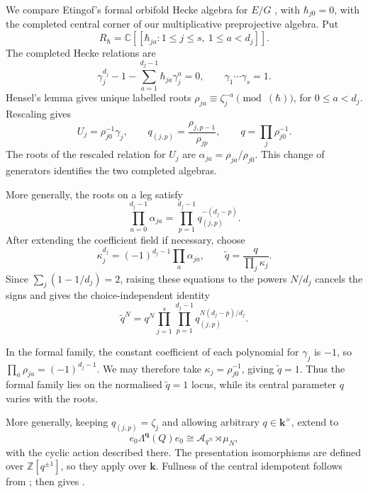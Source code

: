 \documentclass[a4paper]{amsart}
\newcommand{\kk}{\mathbf{k}}
\newcommand{\ZZ}{\mathbb{Z}}
\newcommand{\C}{\mathbb{C}}
\numberwithin{equation}{section}
\begin{document}
We compare Etingof's formal orbifold Hecke algebra for $E/G$
\cite{EtingofOrbifold}, with $\hbar_{j0}=0$, with the completed
central corner of our multiplicative preprojective algebra. Put
\[
 R_\hbar=\C[[\hbar_{ja}:1\le j\le s,\ 1\le a<d_j]].
\]
The completed Hecke relations are
\[
 \gamma_j^{d_j}-1-\sum_{a=1}^{d_j-1}\hbar_{ja}\gamma_j^a=0,
 \qquad \gamma_1\cdots\gamma_s=1.
\]
Hensel's lemma gives unique labelled roots
$\rho_{ja}\equiv\zeta_j^{-a}\pmod{(\hbar)}$, for
$0\le a<d_j$. Rescaling gives
\begin{equation}\label{eq:formal-parameter-dictionary}
 U_j=\rho_{j0}^{-1}\gamma_j,\qquad
 q_{(j,p)}=\frac{\rho_{j,p-1}}{\rho_{jp}},\qquad
 q=\prod_j\rho_{j0}^{-1}.
\end{equation}
The roots of the rescaled relation for $U_j$ are
$\alpha_{ja}=\rho_{ja}/\rho_{j0}$. This change of generators
identifies the two completed algebras.

More generally, the roots on a leg satisfy
\[
 \prod_{a=0}^{d_j-1}\alpha_{ja}
 =\prod_{p=1}^{d_j-1}q_{(j,p)}^{-(d_j-p)}.
\]
After extending the coefficient field if necessary, choose
\[
 \kappa_j^{d_j}=(-1)^{d_j-1}\prod_a\alpha_{ja},\qquad
 \widetilde q=\frac{q}{\prod_j\kappa_j}.
\]
Since $\sum_j(1-1/d_j)=2$, raising these equations to the powers
$N/d_j$ cancels the signs and gives the choice-independent identity
\begin{equation}\label{eq:normalised-parameter}
 \widetilde q^N
   =q^N\prod_{j=1}^s\prod_{p=1}^{d_j-1}
          q_{(j,p)}^{N(d_j-p)/d_j}.
\end{equation}

In the formal family, the constant coefficient of each polynomial
for $\gamma_j$ is $-1$, so $\prod_a\rho_{ja}=(-1)^{d_j-1}$.
We may therefore take $\kappa_j=\rho_{j0}^{-1}$, giving
$\widetilde q=1$. Thus the formal family lies on the normalised
$\widetilde q=1$ locus, while its central parameter $q$ varies
with the roots.

More generally, keeping $q_{(j,p)}=\zeta_j$ and allowing arbitrary
$q\in\kk^\times$, \cite[Sections~2 and~4.1]{EOR} extend
 to
\begin{equation}\label{eq:quantum-corner}
 e_0\Lambda^{\boldsymbol q}(Q)e_0
 \cong\mathcal A_{q^N}\rtimes\mu_N,
\end{equation}
with the cyclic action described there. The presentation
isomorphisms are defined over $\ZZ[q^{\pm1}]$, so they apply
over $\kk$. Fullness of the central idempotent follows from
;  then gives
.
\end{document}
